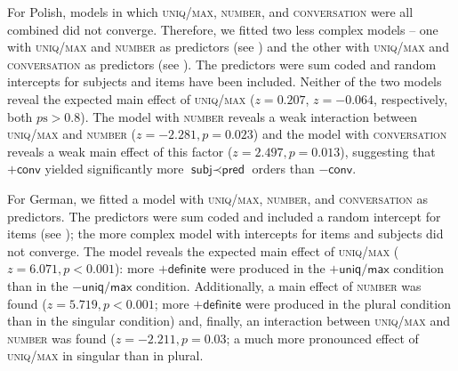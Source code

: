 \documentclass[output=paper]{langscibook}
\begin{document}
For Polish, models in which \textsc{uniq/max}, \textsc{number}, and \textsc{conversation} were all combined did not converge. Therefore, we fitted two less complex models -- one with \textsc{uniq/max} and \textsc{number} as predictors (see ) and the other with \textsc{uniq/max} and \textsc{conversation} as predictors (see ). The predictors were sum coded and random intercepts for subjects and items have been included. Neither of the two models reveal the expected main effect of \textsc{uniq/max} ($z=0.207$, $z=-0.064$, respectively, both $p\text{s}>0.8$). The model with \textsc{number} reveals a weak interaction between \textsc{uniq/max} and \textsc{number} ($z=-2.281,p=0.023$) and the model with \textsc{conversation} reveals a weak main effect of this factor ($z=2.497,p=0.013$), suggesting that $+\textsf{conv}$ yielded significantly more $\textsf{subj}\prec\textsf{pred}$ orders than $-\textsf{conv}$.

For German, we fitted a model with \textsc{uniq/max}, \textsc{number}, and \textsc{conversation} as predictors. The predictors were sum coded and included a random intercept for items (see ); the more complex model with intercepts for items and subjects did not converge. The model reveals the expected main effect of \textsc{uniq/max} ($z=6.071,p<0.001$): more $+\textsf{definite}$ were produced in the $+\textsf{uniq/max}$ condition than in the $-\textsf{uniq/max}$ condition. Additionally, a main effect of \textsc{number} was found ($z=5.719,p<0.001$; more $+\textsf{definite}$ were produced in the \textsf{plural} condition than in the \textsf{singular} condition) and, finally, an interaction between \textsc{uniq/max} and \textsc{number} was found ($z=-2.211,p=0.03$; a much more pronounced effect of \textsc{uniq/max} in \textsf{singular} than in \textsf{plural}.

\end{document}
